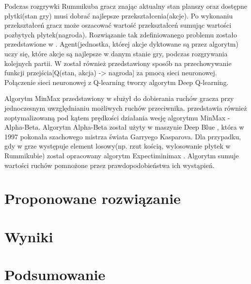 \documentclass[twoside,twocolumn]{article}
\begin{document}
Podczas rozgrywki Rummikuba gracz znając aktualny stan planszy oraz dostępne płytki(stan gry) musi dobrać najlepsze 
przekształcenia(akcje). Po wykonaniu przekształceń gracz może oszacować wartość przekształceń sumując wartości pozbytych 
płytek(nagroda). Rozwiązanie tak zdefiniowanego problemu zostało przedstawione w \cite{Kaelbling:1996}. Agent(jednostka, której akcje dyktowane są przez algorytm) uczy się, które akcje są najlepsze 
w danym stanie gry, podczas rozgrywania kolejnych partii. W \cite{Kaelbling:1996} został również przedstawiony sposób na przechowywanie funkcji przejścia[Q(stan, akcja) -> nagroda] 
za pmocą sieci neuronowej. Połączenie sieci neuronowej z Q-learning tworzy algorytm Deep Q-learning.

Algorytm MinMax przedstawiony w \cite{Winston:1992} służył do dobierania ruchów gracza przy jednoczesnym uwzględnianiu możliwych ruchów przeciwnika. 
\cite{Winston:1992} przedstawia również zoptymalizowaną pod kątem prędkości działania wesję algorytmu MinMax - Alpha-Beta. Algorytm Alpha-Beta został użyty w maszynie  
Deep Blue\textsuperscript{\textregistered} \cite{Campbell:2002}, która w 1997 pokonała szachowego mistrza świata Garryego Kasparova. Dla przypadku, gdy w grze występuje 
element losowy(np. rzut kością, wylosowanie płytek w Rummikubie) został opracowany algorytm Expectiminimax \cite{Stuart:2009}. Algorytm sumuje wartości ruchów pomnożone 
przez prawdopodobieństwa ich wystąpień.

\section{Proponowane rozwiązanie}
\section{Wyniki}

\section{Podsumowanie}





\end{document}

